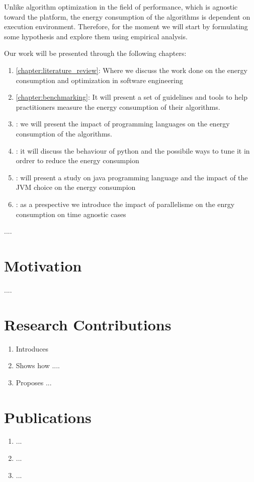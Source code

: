 Unlike algorithm optimization in the field of performance, which is agnostic toward the platform, the energy consumption of the algorithms is dependent on execution environment.
Therefore, for the moment we will start by formulating some hypothesis and explore them using empirical analysis.

Our work will be presented through the following chapters:
\begin{enumerate}
    \item \ref{chapter:literature_review}: Where we discuss the work done on the energy consumption and optimization in software engineering
    \item \ref{chapter:benchmarking}: It will present a set of guidelines and tools to help practitioners measure the energy consumption of their algorithms.
    \item : we will present the impact of programming languages on the energy consumption of the algorithms.
    \item : it will discuss the behaviour of python and the possibile ways to tune it in ordrer to reduce the energy consumpion
    \item : will present a study on java programming language and the impact of the JVM choice on the energy consumpion
    \item : as a prespective we introduce the impact of parallelisme on the enrgy consumption on time agnostic cases
\end{enumerate}




....


\section{Motivation}
....


\section{Research Contributions}


\begin{enumerate}

    \item Introduces
    \item Shows how ....
    \item Proposes ...

\end{enumerate}



\section{Publications}

\begin{enumerate}
    \item ...

    \item ...

    \item ...

\end{enumerate}
\cleardoublepage
